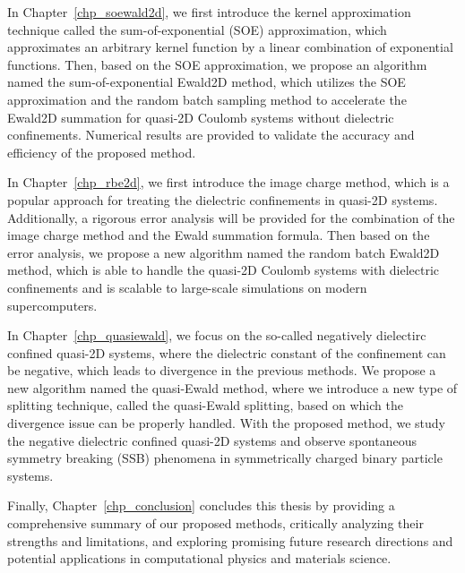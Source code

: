 In Chapter~\ref{chp_soewald2d}, we first introduce the kernel approximation technique called the sum-of-exponential (SOE) approximation, which approximates an arbitrary kernel function by a linear combination of exponential functions.
Then, based on the SOE approximation, we propose an algorithm named the sum-of-exponential Ewald2D method, which utilizes the SOE approximation and the random batch sampling method to accelerate the Ewald2D summation for quasi-2D Coulomb systems without dielectric confinements.
Numerical results are provided to validate the accuracy and efficiency of the proposed method.

In Chapter~\ref{chp_rbe2d}, we first introduce the image charge method, which is a popular approach for treating the dielectric confinements in quasi-2D systems.
Additionally, a rigorous error analysis will be provided for the combination of the image charge method and the Ewald summation formula.
Then based on the error analysis, we propose a new algorithm named the random batch Ewald2D method, which is able to handle the quasi-2D Coulomb systems with dielectric confinements and is scalable to large-scale simulations on modern supercomputers.


In Chapter~\ref{chp_quasiewald}, we focus on the so-called negatively dielectirc confined quasi-2D systems, where the dielectric constant of the confinement can be negative, which leads to divergence in the previous methods.
We propose a new algorithm named the quasi-Ewald method, where we introduce a new type of splitting technique, called the quasi-Ewald splitting, based on which the divergence issue can be properly handled.
With the proposed method, we study the negative dielectric confined quasi-2D systems and observe spontaneous symmetry breaking (SSB) phenomena in symmetrically charged binary particle systems.

Finally, Chapter~\ref{chp_conclusion} concludes this thesis by providing a comprehensive summary of our proposed methods, critically analyzing their strengths and limitations, and exploring promising future research directions and potential applications in computational physics and materials science.